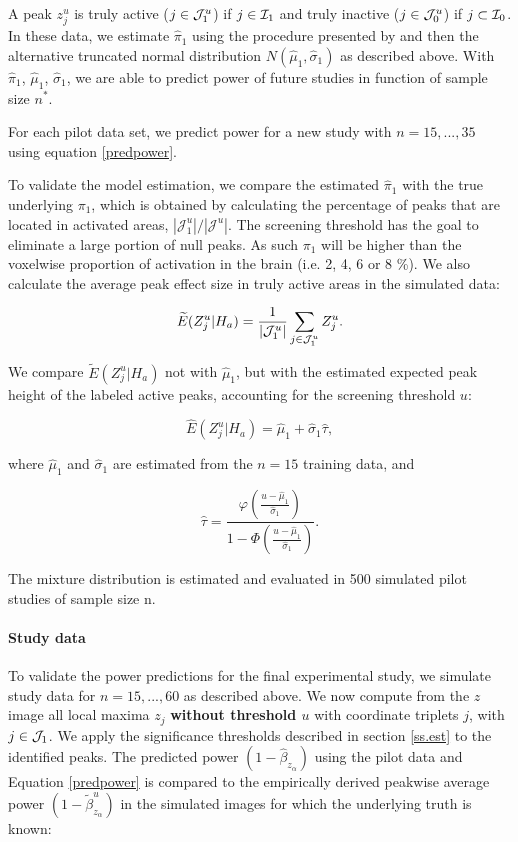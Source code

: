 A peak $z_j^u$ is truly active ($j \in {\cal J}_1^u$) if $j \in {\cal I}_1$ and truly inactive ($j \in {\cal J}_0^u$) if $j \subset {\cal I}_0$.  In these data, we estimate $\hat\pi_1$ using the procedure presented by \citet{Pounds2003} and then the alternative truncated normal distribution $N(\hat\mu_1,\hat\sigma_1)$ as described above.  With $\hat{\pi}_1$, $\hat\mu_1$, $\hat\sigma_1$, we are able to predict power of future studies in function of sample size $n^*$.

For each pilot data set, we predict power for a new study with $n=15,...,35$ using equation \ref{predpower}.

To validate the model estimation, we compare the estimated $\hat\pi_1$ with the true underlying $\pi_1$, which is obtained by calculating the percentage of peaks that are located in activated areas, $|\mathcal{J}_1^u|/|\mathcal{J}^u|$. The screening threshold has the goal to eliminate a large portion of null peaks.  As such $\pi_1$ will be higher than the voxelwise proportion of activation in the brain (i.e. 2, 4, 6 or 8 \%).  We also calculate the average peak effect size in truly active areas in the simulated data:

\begin{equation}
\widetilde{E}(Z_j^u|H_a) = \frac{1}{|{\cal J}_1^u|}\sum_{j\in {\cal J}_1^u} Z_j^u. \nonumber
\end{equation}

We compare $\widetilde{E}(Z^u_j|H_a)$ not with $\hat\mu_1$, but with the estimated expected peak height of the labeled active peaks, accounting for the screening threshold $u$:

\begin{equation}
 \widehat{E}(Z_j^u|H_a) = \hat{\mu}_1 + \hat{\sigma}_1 \hat\tau, \label{tau}
\end{equation}

where $\hat\mu_1$ and $\hat\sigma_1$ are estimated from the $n=15$ training data, and

\begin{equation}
 \hat\tau = \frac{\varphi \left( \frac{u-\hat\mu_1}{\hat\sigma_1} \right) } {{1-\Phi}\left( \frac{u-\hat\mu_1}{\hat\sigma_1} \right)}. \nonumber
\end{equation}

The mixture distribution is estimated and evaluated in 500 simulated pilot studies of sample size n.

\paragraph{Study data} To validate the power predictions for the final experimental study, we simulate study data for {\color{Cyan}$n=15,...,60$} as described above.  {\color{Cyan}We now compute from the $z$ image  all local maxima $z_j$ \textbf{without threshold $u$} with coordinate triplets $j$, with $j \in {\cal J}_1$. We apply the significance thresholds described in section \ref{ss.est} to the identified peaks.}
The predicted power $(1-\hat\beta_{z_\alpha})$ using the pilot data and Equation \ref{predpower} is compared to the empirically derived peakwise average power $(1-\tilde\beta^u_{z_\alpha})$ in the simulated images for which the underlying truth is known:


